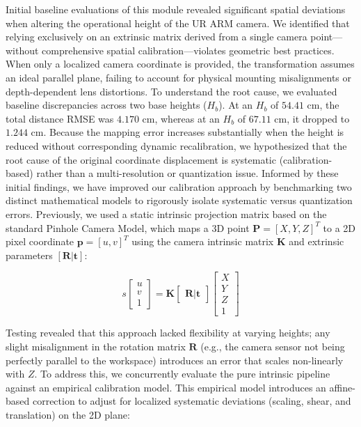 \documentclass[12pt]{extarticle}
\begin{document}
Initial baseline evaluations of this module revealed significant spatial deviations when altering the operational height of the UR ARM camera. We identified that relying exclusively on an extrinsic matrix derived from a single camera point---without comprehensive spatial calibration---violates geometric best practices. When only a localized camera coordinate is provided, the transformation assumes an ideal parallel plane, failing to account for physical mounting misalignments or depth-dependent lens distortions. To understand the root cause, we evaluated baseline discrepancies across two base heights ($H_b$). At an $H_b$ of $54.41\text{ cm}$, the total distance RMSE was $4.170\text{ cm}$, whereas at an $H_b$ of $67.11\text{ cm}$, it dropped to $1.244\text{ cm}$. Because the mapping error increases substantially when the height is reduced without corresponding dynamic recalibration, we hypothesized that the root cause of the original coordinate displacement is systematic (calibration-based) rather than a multi-resolution or quantization issue.
Informed by these initial findings, we have improved our calibration approach by benchmarking two distinct mathematical models to rigorously isolate systematic versus quantization errors. Previously, we used a static intrinsic projection matrix based on the standard Pinhole Camera Model, which maps a 3D point $\mathbf{P} = [X, Y, Z]^T$ to a 2D pixel coordinate $\mathbf{p} = [u, v]^T$ using the camera intrinsic matrix $\mathbf{K}$ and extrinsic parameters $[\mathbf{R} | \mathbf{t}]$:

$$s \begin{bmatrix} u \\ v \\ 1 \end{bmatrix} = \mathbf{K} \begin{bmatrix} \mathbf{R} | \mathbf{t} \end{bmatrix} \begin{bmatrix} X \\ Y \\ Z \\ 1 \end{bmatrix}$$

Testing revealed that this approach lacked flexibility at varying heights; any slight misalignment in the rotation matrix $\mathbf{R}$ (e.g., the camera sensor not being perfectly parallel to the workspace) introduces an error that scales non-linearly with $Z$. To address this, we concurrently evaluate the pure intrinsic pipeline against an empirical calibration model. This empirical model introduces an affine-based correction to adjust for localized systematic deviations (scaling, shear, and translation) on the 2D plane:
\end{document}
